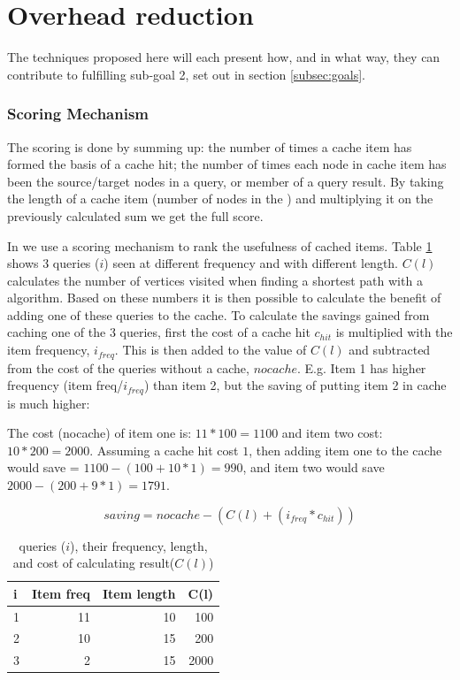 \section{Overhead reduction}
The techniques proposed here will each present how, and in what way, they can contribute to fulfilling sub-goal 2, set out in section \ref{subsec:goals}.

\subsubsection{Scoring Mechanism}


The scoring is done by summing up: the number of times a cache item has formed the basis of a cache hit; the number of times each node in cache item has been the source/target nodes in a query, or member of a query result. By taking the length of a cache item (number of nodes in the \spath) and multiplying it on the previously calculated sum we get the full score.

In \osc we use a scoring mechanism to rank the usefulness of cached items. Table \ref{tab:score} shows 3 queries ($i$) seen at different frequency and with different length. $C(l)$ calculates the number of vertices visited when finding a shortest path with a \spath algorithm. Based on these numbers it is then possible to calculate the benefit of adding one of these \spath queries to the cache. To calculate the savings gained from caching one of the 3 queries, first the cost of a cache hit $c_{hit}$ is multiplied with the item frequency, $i_{freq}$. This is then added to the value of $C(l)$ and subtracted from the cost of the queries without a cache, $nocache$. E.g. Item 1 has higher frequency (item freq/$i_{freq}$) than item 2, but the saving of putting item 2 in cache is much higher:

The cost (nocache) of item one is: $11*100=1100$ and item two cost: $10*200=2000$. Assuming a cache hit cost $1$, then adding item one to the cache would save = $1100-(100+10*1)=990$, and item two would save $2000-(200+9*1)=1791$. 

\begin{equation}\label{eq:cachesaving}
saving = nocache - (C(l) + (i_{freq} * c_{hit}))
\end{equation}


\begin{table}
\begin{center}
\begin{tabular}{l|r|r|r}
\hline \bf i & \bf Item freq & \bf Item length & \bf C(l) \\\hline
1 & 11 & 10 & 100 \\
2 & 10 & 15 & 200 \\
3 & 2 & 15 & 2000 \\\hline
\end{tabular}
\end{center}
\caption{\spath queries ($i$), their frequency, length, and cost of calculating result($C(l)$)}
\label{tab:score}
\end{table}


